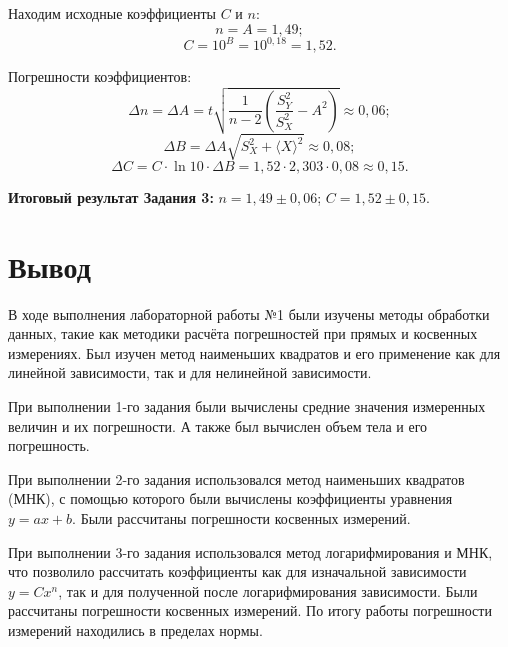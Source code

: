 Находим исходные коэффициенты $C$ и $n$:
$$ n = A = 1,49; $$
$$ C = 10^B = 10^{0,18} = 1,52. $$

Погрешности коэффициентов:
$$ \Delta n = \Delta A = t \sqrt{\frac{1}{n-2} \left( \frac{S_Y^2}{S_X^2} - A^2 \right)} \approx 0,06; $$
$$ \Delta B = \Delta A \sqrt{S_X^2 + \langle X \rangle^2} \approx 0,08; $$
$$ \Delta C = C \cdot \ln 10 \cdot \Delta B = 1,52 \cdot 2,303 \cdot 0,08 \approx 0,15. $$

\textbf{Итоговый результат Задания 3:}
$n = 1,49 \pm 0,06$; $C = 1,52 \pm 0,15$.

\section*{Вывод}
В ходе выполнения лабораторной работы №1 были изучены методы обработки данных, такие как методики расчёта погрешностей при прямых и косвенных измерениях. Был изучен метод наименьших квадратов и его применение как для линейной зависимости, так и для нелинейной зависимости.

При выполнении 1-го задания были вычислены средние значения измеренных величин и их погрешности. А также был вычислен объем тела и его погрешность.

При выполнении 2-го задания использовался метод наименьших квадратов (МНК), с помощью которого были вычислены коэффициенты уравнения $y = ax + b$. Были рассчитаны погрешности косвенных измерений.

При выполнении 3-го задания использовался метод логарифмирования и МНК, что позволило рассчитать коэффициенты как для изначальной зависимости $y = Cx^n$, так и для полученной после логарифмирования зависимости. Были рассчитаны погрешности косвенных измерений. По итогу работы погрешности измерений находились в пределах нормы.